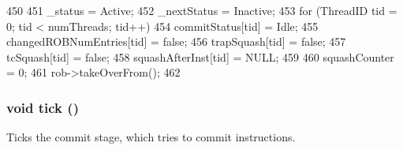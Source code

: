 \begin{DoxyCode}
450 {
451     _status = Active;
452     _nextStatus = Inactive;
453     for (ThreadID tid = 0; tid < numThreads; tid++) {
454         commitStatus[tid] = Idle;
455         changedROBNumEntries[tid] = false;
456         trapSquash[tid] = false;
457         tcSquash[tid] = false;
458         squashAfterInst[tid] = NULL;
459     }
460     squashCounter = 0;
461     rob->takeOverFrom();
462 }
\end{DoxyCode}
\hypertarget{classDefaultCommit_a873dd91783f9efb4a590aded1f70d6b0}{
\subsubsection[{tick}]{\setlength{\rightskip}{0pt plus 5cm}void tick ()}}
\label{classDefaultCommit_a873dd91783f9efb4a590aded1f70d6b0}
Ticks the commit stage, which tries to commit instructions. 


